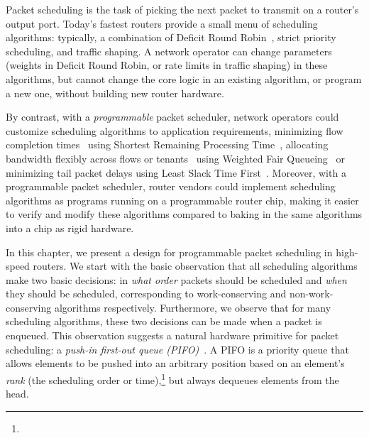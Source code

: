 Packet scheduling is the task of picking the next packet to transmit on a
router's output port.  Today's fastest routers provide a small menu of
scheduling algorithms: typically, a combination of Deficit Round
Robin~\cite{drr}, strict priority scheduling, and traffic shaping. A network
operator can change parameters (\eg weights in Deficit Round Robin, or rate
limits in traffic shaping) in these algorithms, but cannot change the core
logic in an existing algorithm, or program a new one, without building new
router hardware.

By contrast, with a {\em programmable} packet scheduler, network operators
could customize scheduling algorithms to application requirements, \eg
minimizing flow completion times~\cite{pFabric} using Shortest Remaining
Processing Time~\cite{srpt}, allocating bandwidth flexibly across flows or
tenants~\cite{eyeq, faircloud} using Weighted Fair Queueing~\cite{wfq} or
minimizing tail packet delays using Least Slack Time First~\cite{lstf}.
Moreover, with a programmable packet scheduler, router vendors could implement
scheduling algorithms as programs running on a programmable router chip, making
it easier to verify and modify these algorithms compared to baking in the same
algorithms into a chip as rigid hardware.

In this chapter, we present a design for programmable packet scheduling in
high-speed routers. We start with the basic observation that all scheduling
algorithms make two basic decisions: in {\em what order} packets should be
scheduled and {\em when} they should be scheduled, corresponding to
work-conserving and non-work-conserving algorithms respectively.  Furthermore,
we observe that for many scheduling algorithms, these two decisions can be made
when a packet is enqueued. 
This observation suggests a natural hardware primitive for packet scheduling: a
{\em push-in first-out queue (PIFO)}~\cite{pifo}. A PIFO is a priority queue
that allows elements to be pushed into an arbitrary position based on an
element's {\em rank} (the scheduling order or time),\footnote{} but always
dequeues elements from the head.


